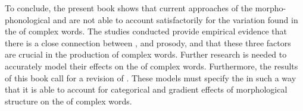 To conclude, the present book shows that current approaches of the morpho-phonological and  are not able to account satisfactorily for the variation found in the  of complex words. 
 The studies conducted provide empirical evidence that there is a close connection between ,  and prosody, and that these three factors are crucial in the production of complex words. 
Further research is needed to accurately model their effects on the  of complex words.
Furthermore, the results of this book call for a revision of . These models must specify the  in such a way that it is able to account for categorical and gradient effects of morphological structure on the  of complex words.
